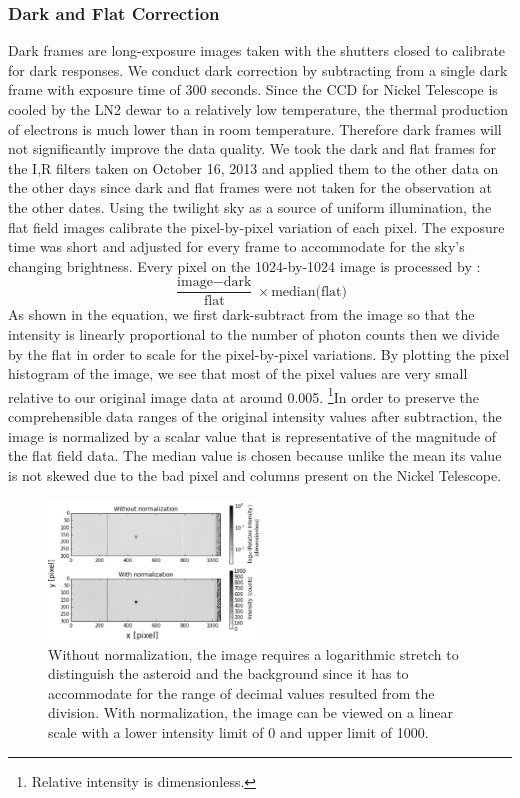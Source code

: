\documentclass[authoryear, 12pt,5p, times]{elsarticle}
\begin{document}
\subsubsection{Dark and Flat Correction}
	Dark frames are long-exposure images taken with the shutters closed to calibrate for dark responses. We conduct dark correction by subtracting from a single dark frame with  exposure time of 300 seconds. Since the CCD for Nickel Telescope is cooled by the LN2 dewar to a relatively low temperature, the thermal production of electrons is much lower than in room temperature. Therefore dark frames will not significantly improve the data quality. We took the dark and flat frames for the I,R filters taken on October 16, 2013  and applied them to the other data on the other days since dark and flat frames were not taken for the observation at the other dates. Using the twilight sky as a source of uniform illumination, the flat field images calibrate the pixel-by-pixel variation of each pixel. The exposure time was short and adjusted for every frame to accommodate for the sky's changing brightness. Every pixel on the 1024-by-1024 image is processed by : 
			\begin{equation}
			\frac{\text{image}-\text{dark}}{\text{flat}}\times\text{median(flat)}
			\end{equation}
		 As shown in the equation, we first dark-subtract from the image so that the intensity is linearly proportional to the number of photon counts then we divide by the flat in order to scale for the pixel-by-pixel variations. By plotting the pixel histogram of the image, we see that most of the pixel values are very small relative to our original image data at around 0.005. \footnote{Relative intensity is dimensionless.}In order to preserve the comprehensible data ranges of the original intensity values after subtraction,  the image is normalized by a scalar value that is representative of the magnitude of the flat field data. The median value is chosen because unlike the mean its value is not skewed due to the bad pixel and columns present on the Nickel Telescope.

	\begin{figure}[h!]
\includegraphics[width=0.5\textwidth]{figures/normalization}
\caption{Without normalization, the image requires a logarithmic stretch to distinguish the asteroid and the background since it has to accommodate for the range of decimal values resulted from the division. With normalization, the image can be viewed on a linear scale with a lower intensity limit of 0 and upper limit of 1000.}
\label{normalization}
\end{figure}
\end{document}
